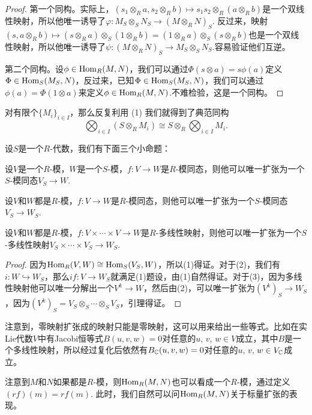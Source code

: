 \begin{proof} 第一个同构。实际上，$(s_1\otimes_R a,s_2\otimes_R b)\mapsto s_1s_2\otimes_R(a\otimes_R b)$是一个双线性映射，所以他唯一诱导了$\varphi:M_S\otimes_S N_S\to (M\otimes_R N)_S$. 反过来，映射$(s,a\otimes_R b)\mapsto (s\otimes_R a)\otimes_S (1\otimes_R b)=(1\otimes_R a)\otimes_S (s\otimes_R b)$也是一个双线性映射，所以他唯一诱导了$\psi:(M\otimes_R N)_S\to M_S\otimes_S N_S$.容易验证他们互逆。

第二个同构。设$\phi\in \operatorname{Hom}_R(M,N)$，我们可以通过$\Phi(s\otimes a)=s\phi(a)$定义$\Phi\in \operatorname{Hom}_S(M_S,N)$，反过来，已知$\Phi\in \operatorname{Hom}_S(M_S,N)$，我们可以通过$\phi(a)=\Phi(1\otimes a)$来定义$\phi\in \operatorname{Hom}_R(M,N)$.不难检验，这是一个同构。 \end{proof}

对有限个$\{M_i\}_{i\in I}$，那么反复利用 (1) 我们就得到了典范同构
\[
	\bigotimes_{i\in I} \left(S\otimes_RM_i\right)\cong S\otimes_R\bigotimes_{i\in I} M_i.
\]

\begin{pro}
设$S$是一个$R$-代数，我们有下面三个小命题：
\begin{compactenum}[~~~(1)]
\item 设$V$是一个$R$-模，$W$是一个$S$-模，$f:V\to W$是$R$-模同态，则他可以唯一扩张为一个$S$-模同态$V_S\to W$.
\item 设$V$和$W$都是$R$-模，$f:V\to W$是$R$-模同态，则他可以唯一扩张为一个$S$-模同态$V_S\to W_S$.
\item 设$V$和$W$都是$R$-模，$f:V\times\cdots\times V\to W$是$R$-多线性映射，则他可以唯一扩张为一个$S$-多线性映射$V_S\times\cdots\times V_S\to W_S$.
\end{compactenum}
\end{pro}

\begin{proof} 
	因为$\operatorname{Hom}_R(V,W)\cong \operatorname{Hom}_S(V_S,W)$，所以(1)得证。对于(2)，我们有$i:W\hookrightarrow W_S$，那么$if:V\to W_S$就满足(1)题设，由(1)自然得证。对于(3)，因为多线性映射他可以唯一分解出一个$V^k\to W$，然后由(2)，可以唯一扩张为$(V^k)_S\to W_S$，因为$(V^k)_S=V_S\otimes_S \cdots\otimes_S V_S$，引理得证。
\end{proof}

注意到，零映射扩张成的映射只能是零映射，这可以用来给出一些等式。比如在实Lie代数$V$中有Jacobi恒等式$B(u,v,w)=0$对任意的$u$, $v$, $w\in V$成立，其中$B$是一个多线性映射，所以经过复化后依然有$B_{\mathbb{C}} (u,v,w)=0$对任意的$u$, $v$, $w\in V_{\mathbb{C}}$成立。

\para 注意到$M$和$N$如果都是$R$-模，则$\operatorname{Hom}_R(M,N)$也可以看成一个$R$-模，通过定义$(rf)(m)=rf(m)$. 此时，我们自然可以问$\operatorname{Hom}_R(M,N)$关于标量扩张的表现。

